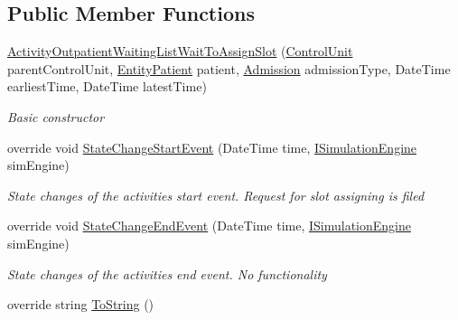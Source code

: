 \subsection*{Public Member Functions}
\begin{DoxyCompactItemize}
\item 
\hyperlink{class_general_health_care_elements_1_1_department_models_1_1_outpatient_1_1_waiting_list_1_1_act8586a0b22c75d36396c6c75291998c21_a655f38e5303763098b6097a6616508c1}{Activity\+Outpatient\+Waiting\+List\+Wait\+To\+Assign\+Slot} (\hyperlink{class_simulation_core_1_1_h_c_c_m_elements_1_1_control_unit}{Control\+Unit} parent\+Control\+Unit, \hyperlink{class_general_health_care_elements_1_1_entities_1_1_entity_patient}{Entity\+Patient} patient, \hyperlink{class_general_health_care_elements_1_1_treatment_admission_types_1_1_admission}{Admission} admission\+Type, Date\+Time earliest\+Time, Date\+Time latest\+Time)
\begin{DoxyCompactList}\small\item\em Basic constructor \end{DoxyCompactList}\item 
override void \hyperlink{class_general_health_care_elements_1_1_department_models_1_1_outpatient_1_1_waiting_list_1_1_act8586a0b22c75d36396c6c75291998c21_a824d5ef6804574c0358241c9b12270a4}{State\+Change\+Start\+Event} (Date\+Time time, \hyperlink{interface_simulation_core_1_1_simulation_classes_1_1_i_simulation_engine}{I\+Simulation\+Engine} sim\+Engine)
\begin{DoxyCompactList}\small\item\em State changes of the activities start event. Request for slot assigning is filed \end{DoxyCompactList}\item 
override void \hyperlink{class_general_health_care_elements_1_1_department_models_1_1_outpatient_1_1_waiting_list_1_1_act8586a0b22c75d36396c6c75291998c21_a7283e409856748e79760bb8badfd8094}{State\+Change\+End\+Event} (Date\+Time time, \hyperlink{interface_simulation_core_1_1_simulation_classes_1_1_i_simulation_engine}{I\+Simulation\+Engine} sim\+Engine)
\begin{DoxyCompactList}\small\item\em State changes of the activities end event. No functionality \end{DoxyCompactList}\item 
override string \hyperlink{class_general_health_care_elements_1_1_department_models_1_1_outpatient_1_1_waiting_list_1_1_act8586a0b22c75d36396c6c75291998c21_aa447bf3254a5a8010831350769d7d3b9}{To\+String} ()

\end{DoxyCompactItemize}
